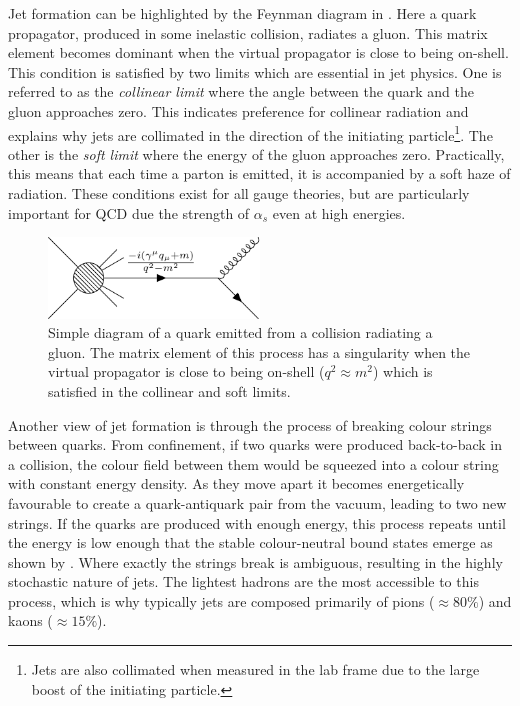Jet formation can be highlighted by the Feynman diagram in .
Here a quark propagator, produced in some inelastic collision, radiates a gluon.
This matrix element becomes dominant when the virtual propagator is close to being on-shell.
This condition is satisfied by two limits which are essential in jet physics.
One is referred to as the \textit{collinear limit} where the angle between the quark and the gluon approaches zero.
This indicates preference for collinear radiation and explains why jets are collimated in the direction of the initiating particle\footnote{Jets are also collimated when measured in the lab frame due to the large boost of the initiating particle.}.
The other is the \textit{soft limit} where the energy of the gluon approaches zero.
Practically, this means that each time a parton is emitted, it is accompanied by a soft haze of radiation.
These conditions exist for all gauge theories, but are particularly important for QCD due the strength of $\alpha_s$ even at high energies.

\begin{figure}[h]
	\centering
	\includegraphics[width=0.5\textwidth]{Feynman/quark_gluon.pdf}
	\caption{Simple diagram of a quark emitted from a collision radiating a gluon. The matrix element of this process has a singularity when the virtual propagator is close to being on-shell ($q^2\approx m^2$) which is satisfied in the collinear and soft limits.}
	\label{fig:quark_gluon}
\end{figure}

Another view of jet formation is through the process of breaking colour strings between quarks.
From confinement, if two quarks were produced back-to-back in a collision, the colour field between them would be squeezed into a colour string with constant energy density.
As they move apart it becomes energetically favourable to create a quark-antiquark pair from the vacuum, leading to two new strings.
If the quarks are produced with enough energy, this process repeats until the energy is low enough that the stable colour-neutral bound states emerge as shown by .
Where exactly the strings break is ambiguous, resulting in the highly stochastic nature of jets.
The lightest hadrons are the most accessible to this process, which is why typically jets are composed primarily of pions ($\approx80\%$) and kaons ($\approx15\%$).

